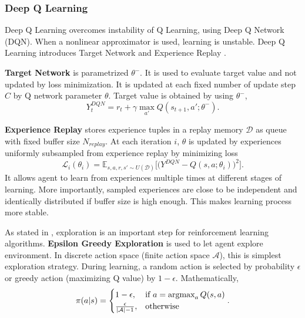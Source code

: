 \subsubsection{Deep Q Learning}
Deep Q Learning overcomes instability of Q Learning, using Deep Q Network (DQN). 
When a nonlinear approximator is used, learning is unstable. 
Deep Q Learning introduces Target Network and Experience Replay \cite{mnih_human-level_2015, mnih_playing_2013}. 

\textbf{Target Network} is parametrized $\theta^-$. 
It is used to evaluate target value and not updated by loss minimization. 
It is updated at each fixed number of update step $C$ by Q network parameter $\theta$. 
Target value is obtained by using $\theta^-$, 
\begin{equation}
\label{eqn:dqn_ntarget}
Y_t^{DQN} = r_t + \gamma \max_{a'} Q(s_{t+1},a';\theta^-).
\end{equation}

\textbf{Experience Replay} stores experience tuples in a replay memory $\mathcal{D}$ as queue with fixed buffer size $N_{replay}$. 
At each iteration $i$, $\theta$ is updated by experiences uniformly subsampled from experience replay by minimizing loss
\begin{equation}
\label{eqn:dqn_loss}
\mathcal{L}_i(\theta_i) = \mathbb{E}_{s,a,r,s'\sim U(\mathcal{D})}\Big[\big( Y^{DQN} - Q(s,a;\theta_i) \big) ^ 2 \Big].
\end{equation}
It allows agent to learn from experiences multiple times at different stages of learning. More importantly, sampled experiences are close to be independent and identically distributed if buffer size is high enough. 
This makes learning process more stable. 

As stated in , exploration is an important step for reinforcement learning algorithms. 
\textbf{Epsilon Greedy Exploration} is used to let agent explore environment. 
In discrete action space (finite action space $\mathcal{A}$), this is 
simplest exploration strategy.
During learning, a random action is selected by probability $\epsilon$ or greedy action (maximizing Q value) by $1-\epsilon$. Mathematically,  
\begin{equation}
\label{eqn:egreedy_policy}
\pi(a|s) = 
\begin{cases}
1-\epsilon,   & \text{if } a = \operatorname{\textup{argmax}}_{a} Q(s, a)\\
\frac{\epsilon}{|\mathcal{A}|-1},     & \text{otherwise}
\end{cases}.
\end{equation}

